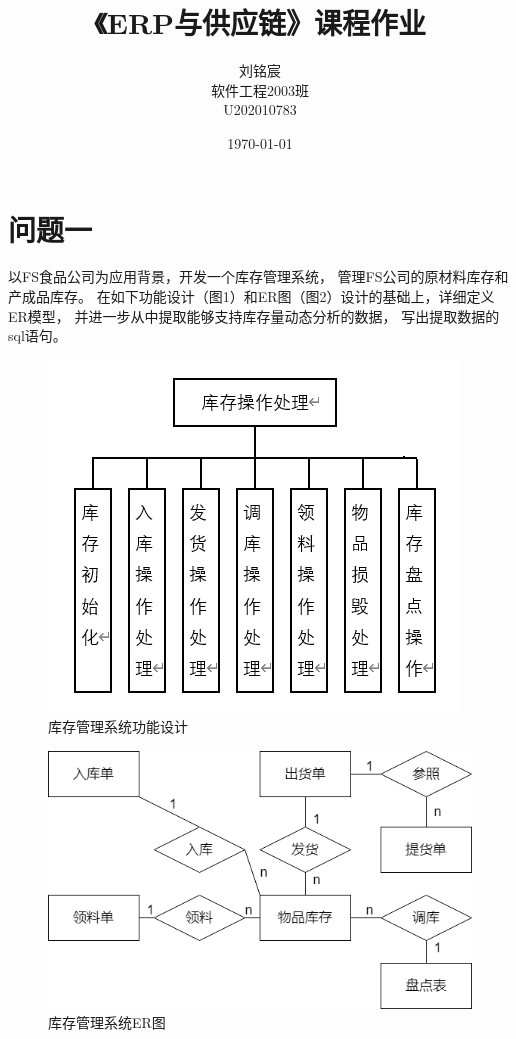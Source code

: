 \documentclass[12pt,a4paper]{article}
\title{《ERP与供应链》课程作业}
\author{刘铭宸\\软件工程2003班\\U202010783}
\date{\today}
\begin{document}
\begin{titlepage}
\maketitle
\end{titlepage}

\tableofcontents

\newpage
\section{问题一}
以FS食品公司为应用背景，开发一个库存管理系统，
管理FS公司的原材料库存和产成品库存。
在如下功能设计（图1）和ER图（图2）设计的基础上，详细定义ER模型，
并进一步从中提取能够支持库存量动态分析的数据，
写出提取数据的sql语句。
\begin{figure}[h]
    \centering
    \includegraphics[scale=0.6]{fig1.png}
    \caption{库存管理系统功能设计}
    \label{fig:1}
\end{figure}
\begin{figure}[h]
    \centering
    \includegraphics[scale=0.6]{fig2.png}
    \caption{库存管理系统ER图}
    \label{fig:2}
\end{figure}
\end{document}
